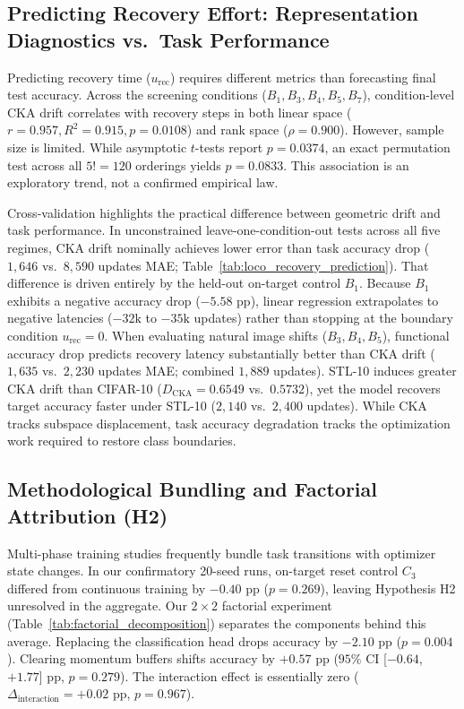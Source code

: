 \documentclass[sn-mathphys,Numbered]{sn-jnl}
\newcommand{\Dcka}{D_{\mathrm{CKA}}}
\begin{document}
\subsection{Predicting Recovery Effort: Representation Diagnostics vs.\ Task Performance}\label{subsec:discussion_recovery_prediction}

Predicting recovery time ($u_{\mathrm{rec}}$) requires different metrics than forecasting final test accuracy. Across the screening conditions ($B_1, B_3, B_4, B_5, B_7$), condition-level CKA drift correlates with recovery steps in both linear space ($r = 0.957, R^2 = 0.915, p = 0.0108$) and rank space ($\rho = 0.900$). However, sample size is limited. While asymptotic $t$-tests report $p = 0.0374$, an exact permutation test across all $5! = 120$ orderings yields $p = 0.0833$. This association is an exploratory trend, not a confirmed empirical law.

Cross-validation highlights the practical difference between geometric drift and task performance. In unconstrained leave-one-condition-out tests across all five regimes, CKA drift nominally achieves lower error than task accuracy drop ($1{,}646$ vs.\ $8{,}590$ updates MAE; Table~\ref{tab:loco_recovery_prediction}). That difference is driven entirely by the held-out on-target control $B_1$. Because $B_1$ exhibits a negative accuracy drop ($-5.58$ pp), linear regression extrapolates to negative latencies ($-32\mathrm{k}$ to $-35\mathrm{k}$ updates) rather than stopping at the boundary condition $u_{\mathrm{rec}} = 0$. When evaluating natural image shifts ($B_3, B_4, B_5$), functional accuracy drop predicts recovery latency substantially better than CKA drift ($1{,}635$ vs.\ $2{,}230$ updates MAE; combined $1{,}889$ updates). STL-10 induces greater CKA drift than CIFAR-10 ($\Dcka = 0.6549$ vs.\ $0.5732$), yet the model recovers target accuracy faster under STL-10 ($2{,}140$ vs.\ $2{,}400$ updates). While CKA tracks subspace displacement, task accuracy degradation tracks the optimization work required to restore class boundaries.

\subsection{Methodological Bundling and Factorial Attribution (H2)}\label{subsec:discussion_bundling}

Multi-phase training studies frequently bundle task transitions with optimizer state changes. In our confirmatory 20-seed runs, on-target reset control $C_3$ differed from continuous training by $-0.40$ pp ($p = 0.269$), leaving Hypothesis H2 unresolved in the aggregate. Our $2 \times 2$ factorial experiment (Table~\ref{tab:factorial_decomposition}) separates the components behind this average. Replacing the classification head drops accuracy by $-2.10$ pp ($p = 0.004$). Clearing momentum buffers shifts accuracy by $+0.57$ pp ($95\%$ CI [$-0.64$, $+1.77$] pp, $p = 0.279$). The interaction effect is essentially zero ($\Delta_{\mathrm{interaction}} = +0.02$ pp, $p = 0.967$).
\end{document}
